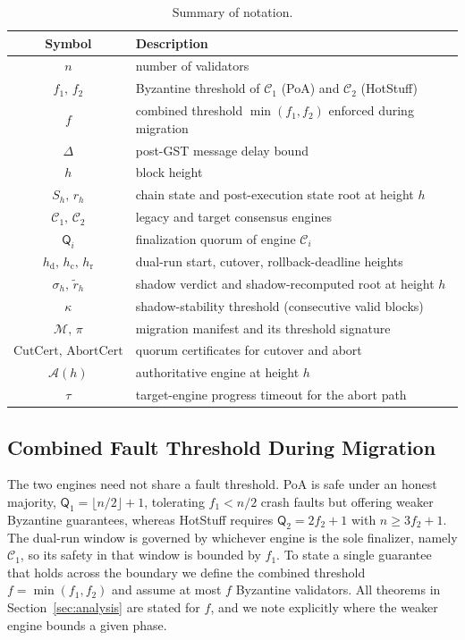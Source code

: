 \documentclass[journal]{IEEEtran}
\begin{document}
\begin{table}[t]
\centering
\caption{Summary of notation.}
\label{tab:notation}
\renewcommand{\arraystretch}{1.15}
\footnotesize
\begin{tabular}{c p{}}
\toprule
Symbol & Description \\
\midrule
$n$ & number of validators \\
$f_1,\,f_2$ & Byzantine threshold of $\mathcal{C}_1$ (PoA) and $\mathcal{C}_2$ (HotStuff) \\
$f$ & combined threshold $\min(f_1,f_2)$ enforced during migration \\
$\Delta$ & post-GST message delay bound \\
$h$ & block height \\
$S_h,\,r_h$ & chain state and post-execution state root at height $h$ \\
$\mathcal{C}_1,\,\mathcal{C}_2$ & legacy and target consensus engines \\
$\mathsf{Q}_i$ & finalization quorum of engine $\mathcal{C}_i$ \\
$h_{\mathrm{d}},\,h_{\mathrm{c}},\,h_{\mathrm{r}}$ & dual-run start, cutover, rollback-deadline heights \\
$\sigma_h,\,\tilde r_h$ & shadow verdict and shadow-recomputed root at height $h$ \\
$\kappa$ & shadow-stability threshold (consecutive valid blocks) \\
$\mathcal{M},\,\pi$ & migration manifest and its threshold signature \\
$\mathrm{CutCert},\,\mathrm{AbortCert}$ & quorum certificates for cutover and abort \\
$\mathcal{A}(h)$ & authoritative engine at height $h$ \\
$\tau$ & target-engine progress timeout for the abort path \\
\bottomrule
\end{tabular}
\end{table}

\subsection{Combined Fault Threshold During Migration}
The two engines need not share a fault threshold. PoA is safe under an honest majority,
$\mathsf{Q}_1=\lfloor n/2\rfloor+1$, tolerating $f_1 < n/2$ crash faults but offering weaker
Byzantine guarantees, whereas HotStuff requires $\mathsf{Q}_2=2f_2+1$ with $n\ge 3f_2+1$. The
dual-run window is governed by whichever engine is the sole finalizer, namely $\mathcal{C}_1$,
so its safety in that window is bounded by $f_1$. To state a single guarantee that holds
across the boundary we define the combined threshold $f=\min(f_1,f_2)$ and assume at most $f$
Byzantine validators. All theorems in Section~\ref{sec:analysis} are stated for $f$, and we
note explicitly where the weaker engine bounds a given phase.
\end{document}
